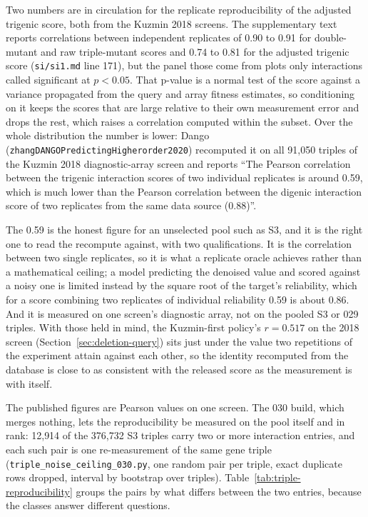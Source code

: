 Two numbers are in circulation for the replicate reproducibility of the adjusted
trigenic score, both from the Kuzmin 2018 screens. The supplementary text reports
correlations between independent replicates of 0.90 to 0.91 for double-mutant and raw
triple-mutant scores and 0.74 to 0.81 for the adjusted trigenic score
(\texttt{si/si1.md} line 171), but the panel those come from plots only interactions
called significant at $p < 0.05$. That p-value is a normal test of the score against a
variance propagated from the query and array fitness estimates, so conditioning on it
keeps the scores that are large relative to their own measurement error and drops the
rest, which raises a correlation computed within the subset. Over the whole
distribution the number is lower: Dango (\texttt{zhangDANGOPredictingHigherorder2020})
recomputed it on all 91{,}050 triples of the Kuzmin 2018 diagnostic-array screen and
reports ``The Pearson correlation between the trigenic interaction scores of two
individual replicates is around 0.59, which is much lower than the Pearson correlation
between the digenic interaction score of two replicates from the same data source
(0.88)''.

The 0.59 is the honest figure for an unselected pool such as S3, and it is the right
one to read the recompute against, with two qualifications. It is the correlation
between two single replicates, so it is what a replicate oracle achieves rather than a
mathematical ceiling; a model predicting the denoised value and scored against a noisy
one is limited instead by the square root of the target's reliability, which for a
score combining two replicates of individual reliability 0.59 is about 0.86. And it is
measured on one screen's diagnostic array, not on the pooled S3 or 029 triples. With
those held in mind, the Kuzmin-first policy's $r = 0.517$ on the 2018 screen
(Section~\ref{sec:deletion-query}) sits just under the value two repetitions of the
experiment attain against each other, so the identity recomputed from the database is
close to as consistent with the released score as the measurement is with itself.

The published figures are Pearson values on one screen. The 030 build, which merges
nothing, lets the reproducibility be measured on the pool itself and in rank: 12{,}914
of the 376{,}732 S3 triples carry two or more interaction entries, and each such pair
is one re-measurement of the same gene triple
(\texttt{triple\_noise\_ceiling\_030.py}, one random pair per triple, exact duplicate
rows dropped, interval by bootstrap over triples). Table~\ref{tab:triple-reproducibility}
groups the pairs by what differs between the two entries, because the classes answer
different questions.

